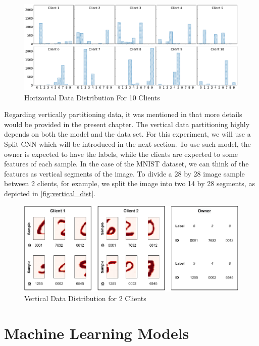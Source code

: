 \begin{figure}[!ht]
    \centering
    \centering
    \includegraphics[width=1\textwidth]{graphics/10_dist.pdf}
    \caption{Horizontal Data Distribution For 10 Clients}
    \label{fig:horizontal_dist}
\end{figure}

Regarding vertically partitioning data, it was mentioned in  that more details would be provided in the present chapter. The vertical data partitioning highly depends on both the model and the data set. For this experiment, we will use a Split-CNN which will be introduced in the next section. To use such model, the owner is expected to have the labels, while the clients are expected to some features of each sample. In the case of the MNIST dataset, we can think of the features as vertical segments of the image. To divide a 28 by 28 image sample between 2 clients, for example, we split the image into two 14 by 28 segments, as depicted in \autoref{fig:vertical_dist}.

\begin{figure}[!ht]
    \centering
    \centering
    \includegraphics[width=1\textwidth]{graphics/vertical_partitioning.pdf}
    \caption{Vertical Data Distribution for 2 Clients}
    \label{fig:vertical_dist}
\end{figure}

\section{Machine Learning Models}

